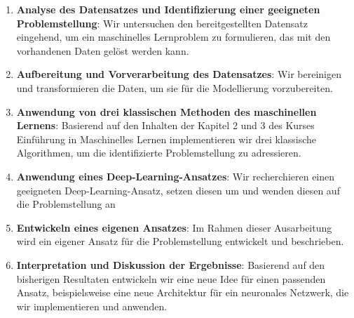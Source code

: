 \begin{enumerate} 
\item \textbf{Analyse des Datensatzes und Identifizierung einer geeigneten Problemstellung}: Wir untersuchen den bereitgestellten Datensatz eingehend, um ein maschinelles Lernproblem zu formulieren, das mit den vorhandenen Daten gelöst werden kann. 
\item \textbf{Aufbereitung und Vorverarbeitung des Datensatzes}: Wir bereinigen und transformieren die Daten, um sie für die Modellierung vorzubereiten. 
\item \textbf{Anwendung von drei klassischen Methoden des maschinellen Lernens}: Basierend auf den Inhalten der Kapitel 2 und 3 des Kurses \glqq Einführung in Maschinelles Lernen\grqq{} implementieren wir drei klassische Algorithmen, um die identifizierte Problemstellung zu adressieren. 
\item \textbf{Anwendung eines Deep-Learning-Ansatzes}: Wir recherchieren einen geeigneten Deep-Learning-Ansatz, setzen diesen um und wenden diesen auf die Problemstellung an
\item \textbf{Entwickeln eines eigenen Ansatzes}: Im Rahmen dieser Ausarbeitung wird ein eigener Ansatz für die Problemstellung entwickelt und beschrieben. 
\item \textbf{Interpretation und Diskussion der Ergebnisse}: Basierend auf den bisherigen Resultaten entwickeln wir eine neue Idee für einen passenden Ansatz, beispielsweise eine neue Architektur für ein neuronales Netzwerk, die wir implementieren und anwenden. \end{enumerate}
